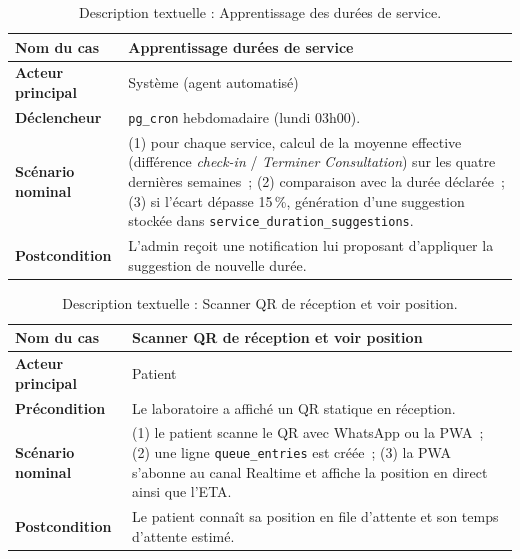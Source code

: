 \begin{table}[H]
  \centering\small
  \caption{Description textuelle : Apprentissage des durées de service.}
  \label{tab:uc-s3-learn}
  \renewcommand{\arraystretch}{1.45}
  \begin{tabular}{|p{3.0cm}|>{\raggedright\arraybackslash}p{10.8cm}|}
    \hline\hline
    \textbf{Nom du cas} & Apprentissage durées de service \\
    \hline
    \textbf{Acteur principal} & Système (agent automatisé) \\
    \hline
    \textbf{Déclencheur} & \texttt{pg\_cron} hebdomadaire
      (lundi 03h00). \\
      \hline
    \textbf{Scénario nominal} &
      (1) pour chaque service, calcul de la moyenne effective
          (différence \emph{check-in} / \emph{Terminer Consultation})
          sur les quatre dernières semaines~;
      (2) comparaison avec la durée déclarée~;
      (3) si l'écart dépasse 15\,\%, génération d'une suggestion
          stockée dans \texttt{service\_duration\_suggestions}. \\
          \hline
    \textbf{Postcondition} & L'admin reçoit une notification lui
      proposant d'appliquer la suggestion de nouvelle durée. \\
    \hline\hline
  \end{tabular}
\end{table}

\begin{table}[H]
  \centering\small
  \caption{Description textuelle : Scanner QR de réception et voir position.}
  \label{tab:uc-s3-queue}
  \renewcommand{\arraystretch}{1.45}
  \begin{tabular}{|p{3.0cm}|>{\raggedright\arraybackslash}p{10.8cm}|}
    \hline\hline
    \textbf{Nom du cas} & Scanner QR de réception et voir position \\
    \hline
    \textbf{Acteur principal} & Patient \\
    \hline
    \textbf{Précondition} & Le laboratoire a affiché un QR statique
      en réception. \\
      \hline
    \textbf{Scénario nominal} &
      (1) le patient scanne le QR avec WhatsApp ou la PWA~;
      (2) une ligne \texttt{queue\_entries} est créée~;
      (3) la PWA s'abonne au canal Realtime et affiche la
          position en direct ainsi que l'ETA. \\
          \hline
    \textbf{Postcondition} & Le patient connaît sa position en
      file d'attente et son temps d'attente estimé. \\
    \hline\hline
  \end{tabular}
\end{table}

